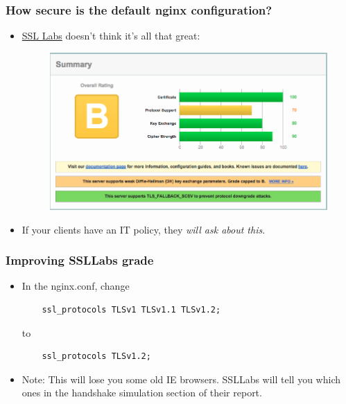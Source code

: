 \documentclass[9pt]{beamer}
\begin{document}
\begin{frame}[fragile]
\frametitle{How secure is the default nginx configuration?}
\begin{itemize}
\item \href{https://www.ssllabs.com/ssltest/analyze.html}{SSL Labs} doesn't think it's all that great:

\begin{figure}
\includegraphics[scale=0.25]{figures/SSLLabsFirstGrade.png}
\end{figure}
\pause
\item If your clients have an IT policy, they \emph{will ask about this}.
\end{itemize}
\end{frame}

\begin{frame}[fragile]
\frametitle{Improving SSLLabs grade}
\begin{itemize}
\item In the nginx.conf, change 
\begin{verbatim}
    ssl_protocols TLSv1 TLSv1.1 TLSv1.2;
\end{verbatim}
to
\begin{verbatim}
    ssl_protocols TLSv1.2;
\end{verbatim}
\pause
\item Note: This will lose you some old IE browsers. SSLLabs will tell you which ones in the handshake simulation section of their report.
\end{itemize}
\end{frame}
\end{document}
